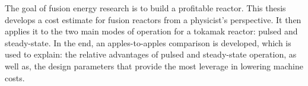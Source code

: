 % 
% 
%
The goal of fusion energy research is to build a profitable reactor. This thesis develops a cost estimate for fusion reactors from a physicist's perspective. It then applies it to the two main modes of operation for a tokamak reactor: pulsed and steady-state. In the end, an apples-to-apples comparison is developed, which is used to explain: the relative advantages of pulsed and steady-state operation, as well as, the design parameters that provide the most leverage in lowering machine costs.
